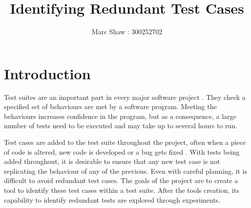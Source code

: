 \documentclass[11pt
              , a4paper
              , twoside
              , openright
              ]{report}
\title{Identifying Redundant Test Cases}
\author{Marc Shaw : 300252702}
\date{}
\begin{document}
\frontmatter



\begin{abstract}


\end{abstract}


\maketitle

\tableofcontents


\listoftables


\mainmatter


 \newpage \chapter{Introduction}\label{C:intro}

Test suites are an important part in every major software project \cite{jeffrey2005test}. They check a specified set of behaviours are met by a software program. Meeting the behaviours increases confidence in the program, but as a consequence, a large number of tests need to be executed and may take up to several hours to run.

Test cases are added to the test suite throughout the project, often when a piece of code is altered, new code is developed or a bug gets fixed \cite{issuetrack,whentotest}. With tests being added throughout, it is desirable to ensure that any new test case is not replicating the behaviour of any of the previous. Even with careful planning, it is difficult to avoid redundant test cases. The goals of the project are to create a tool to identify these test cases within a test suite. After the tools creation, its capability to identify redundant tests are explored through experiments.
\end{document}
